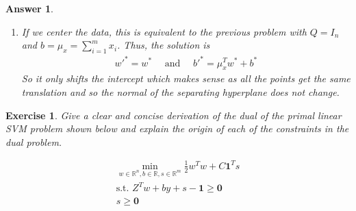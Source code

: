 \documentclass[12pt]{article}
\theoremstyle{colon}
\newtheorem{exercise}{Exercise}
\newtheorem*{answer}{Answer}
\begin{document}
\begin{answer}
\begin{enumerate}[label=\alph*)]
      Notice that the orthonormal matrices canceled each other out in the objective. Also, this problem is identical to what we had before. Thus we have that $\tilde{w} = w^*$ and $\tilde{b} = b^*$. Or undoing the transformations, we have that the solution to the shifted problem is $w'^* = Q w^*$ and $b'^* = b^* + h^T w^*$.

    \item If we center the data, this is equivalent to the previous problem with $Q = I_n$ and $b = \mu_x = \sum_{i=1}^m x_i$. Thus, the solution is
      \begin{gather*}
       w'^* = w^* \quad \text{ and } \quad b'^* = \mu_x^T w^* + b^*
      \end{gather*}
      So it only shifts the intercept which makes sense as all the points get the same translation and so the normal of the separating hyperplane does not change.

  \end{enumerate}
\end{answer}

\clearpage

\begin{exercise}
  Give a clear and concise derivation of the dual of the primal linear SVM problem shown below and explain the origin of each of the constraints in the dual problem.

  \begin{gather*}
    \min_{w \in \mathbb{R}^n, b \in \mathbb{R}, s \in \mathbb{R}^m} \frac{1}{2} w^T w + C \bm{1}^T s \\
    \text{s.t. } Z^T w + b y + s - \bm{1} \geq \bm{0} \\
    s \geq \bm{0}
  \end{gather*}
\end{exercise}
\end{document}
